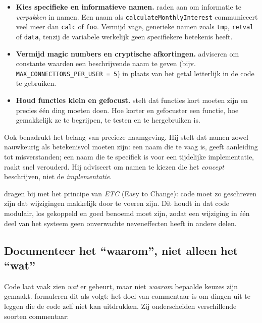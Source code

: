 \begin{itemize}
    \item \textbf{Kies specifieke en informatieve namen.} \textcite{boswell2011readablecode} raden aan om informatie te \textit{verpakken} in namen. Een naam als \texttt{calculateMonthlyInterest} communiceert veel meer dan \texttt{calc} of \texttt{foo}. Vermijd vage, generieke namen zoals \texttt{tmp}, \texttt{retval} of \texttt{data}, tenzij de variabele werkelijk geen specifiekere betekenis heeft.
    \item \textbf{Vermijd magic numbers en cryptische afkortingen.} \textcite{boswell2011readablecode} adviseren om constante waarden een beschrijvende naam te geven (bijv. \texttt{MAX\_CONNECTIONS\_PER\_USER = 5}) in plaats van het getal letterlijk in de code te gebruiken.
    \item \textbf{Houd functies klein en gefocust.} \textcite{martin2008clean} stelt dat functies kort moeten zijn en precies één ding moeten doen. Hoe korter en gefocuster een functie, hoe gemakkelijk ze te begrijpen, te testen en te hergebruiken is.
\end{itemize}

Ook \textcite{ousterhout2018philosophy} benadrukt het belang van precieze naamgeving. Hij stelt dat namen zowel nauwkeurig als betekenisvol moeten zijn: een naam die te vaag is, geeft aanleiding tot misverstanden; een naam die te specifiek is voor een tijdelijke implementatie, raakt snel verouderd. Hij adviseert om namen te kiezen die het \textit{concept} beschrijven, niet de \textit{implementatie}.

\textcite{thomas2019pragmatic} dragen bij met het principe van \textit{ETC} (Easy to Change): code moet zo geschreven zijn dat wijzigingen makkelijk door te voeren zijn. Dit houdt in dat code modulair, los gekoppeld en goed benoemd moet zijn, zodat een wijziging in één deel van het systeem geen onverwachte neveneffecten heeft in andere delen.

\subsection{Documenteer het ``waarom'', niet alleen het ``wat''}
Code laat vaak zien \textit{wat} er gebeurt, maar niet \textit{waarom} bepaalde keuzes zijn gemaakt. \textcite{boswell2011readablecode} formuleren dit als volgt: het doel van commentaar is om dingen uit te leggen die de code zelf niet kan uitdrukken. Zij onderscheiden verschillende soorten commentaar:


